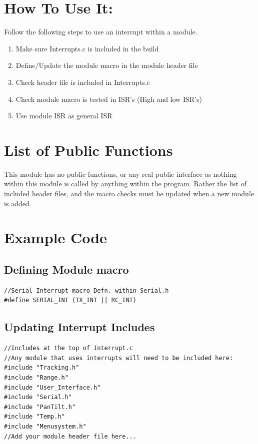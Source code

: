 \documentclass[]{report}
\begin{document}
\section{How To Use It:}
Follow the following steps to use an interrupt within a module.
\begin{enumerate}
	\item Make sure Interrupts.c is included in the build
	\item Define/Update the module macro in the module header file
	\item Check header file is included in Interrupts.c
	\item Check module macro is tested in ISR's (High and low ISR's)
	\item Use module ISR as general ISR
\end{enumerate}

\section{List of Public Functions}
This module has no public functions, or any real public interface as nothing within this module is called by anything within the program. Rather the list of included header files, and the macro checks must be updated when a new module is added.

\section{Example Code}
\subsection{Defining Module macro}
\begin{lstlisting}
//Serial Interrupt macro Defn. within Serial.h
#define SERIAL_INT (TX_INT || RC_INT)
\end{lstlisting}

\subsection{Updating Interrupt Includes}
\begin{lstlisting}
//Includes at the top of Interrupt.c
//Any module that uses interrupts will need to be included here:
#include "Tracking.h"
#include "Range.h"
#include "User_Interface.h"
#include "Serial.h"
#include "PanTilt.h"
#include "Temp.h"
#include "Menusystem.h"
//Add your module header file here...
\end{lstlisting}
\end{document}
